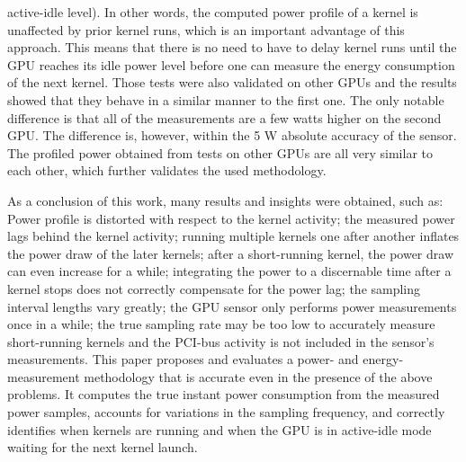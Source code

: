 active-idle level). In other words, the computed power profile of
a kernel is unaffected by prior kernel runs, which is an important
advantage of this approach. This means that there is no need to
have to delay kernel runs until the GPU reaches its idle power
level before one can measure the energy consumption of the next
kernel. Those tests were also validated on other GPUs and the
results showed that they behave in a similar manner to the first
one. The only notable difference is that all of the measurements
are a few watts higher on the second GPU. The difference is,
however, within the 5 W absolute accuracy of the sensor. The
profiled power obtained from tests on other GPUs are all very
similar to each other, which further validates the used methodology.

As a conclusion of this work, many results and insights were
obtained, such as: Power profile is distorted with respect to the
kernel activity; the measured power lags behind the kernel
activity; running multiple kernels one after another inflates the
power draw of the later kernels; after a short-running kernel, the
power draw can even increase for a while; integrating the power to
a discernable time after a kernel stops does not correctly
compensate for the power lag; the sampling interval lengths vary
greatly; the GPU sensor only performs power measurements once in
a while; the true sampling rate may be too low to accurately
measure short-running kernels and the PCI-bus activity is not
included in the sensor's measurements. This paper proposes and
evaluates a power- and energy-measurement methodology that is
accurate even in the presence of the above problems. It computes
the true instant power consumption from the measured power samples,
accounts for variations in the sampling frequency, and correctly
identifies when kernels are running and when the GPU is in
active-idle mode waiting for the next kernel launch.
